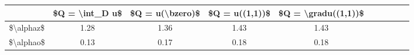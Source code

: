 \begin{tabular}{Sc Sc Sc Sc Sc}
\toprule
{} & \$Q = \textbackslash int\_D u\$ & \$Q = u(\textbackslash bzero)\$ & \$Q = u((1,1))\$ & \$Q = \textbackslash gradu((1,1))\$ \\
\midrule
\$\textbackslash alphaz\$ &           1.28 &            1.36 &           1.43 &                1.43 \\
\$\textbackslash alphao\$ &           0.13 &            0.17 &           0.18 &                0.18 \\
\bottomrule
\end{tabular}
